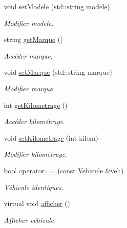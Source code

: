 \begin{DoxyCompactItemize}
void \hyperlink{class_vehicule_a877770a5a09ba45ec23c5d1befad2311}{setModele} (std::string modele)
\begin{DoxyCompactList}\small\item\em Modifier modele. \item\end{DoxyCompactList}\item 
string \hyperlink{class_vehicule_aca7733632f1a0f1f56d76726895a8c78}{getMarque} ()
\begin{DoxyCompactList}\small\item\em Accéder marque. \item\end{DoxyCompactList}\item 
void \hyperlink{class_vehicule_aa203aed9acca9590b347d119e14cf558}{setMarque} (std::string marque)
\begin{DoxyCompactList}\small\item\em Modifier marque. \item\end{DoxyCompactList}\item 
int \hyperlink{class_vehicule_ac5b3c0462bc23251f75da41208b6720c}{getKilometrage} ()
\begin{DoxyCompactList}\small\item\em Accéder kilométrage. \item\end{DoxyCompactList}\item 
void \hyperlink{class_vehicule_afe9c7d3740ae34ab098f1027a93329cd}{setKilometrage} (int kilom)
\begin{DoxyCompactList}\small\item\em Modifier kilométrage. \item\end{DoxyCompactList}\item 
bool \hyperlink{class_vehicule_afa55989329da4544093cad8e99b2f3b2}{operator==} (const \hyperlink{class_vehicule}{Vehicule} \&veh)
\begin{DoxyCompactList}\small\item\em Véhicule identiques. \item\end{DoxyCompactList}\item 
virtual void \hyperlink{class_vehicule_aa83469d5e8e5fa9844cc52698b8ddf76}{afficher} ()
\begin{DoxyCompactList}\small\item\em Afficher véhicule. \item\end{DoxyCompactList}\end{DoxyCompactItemize}


